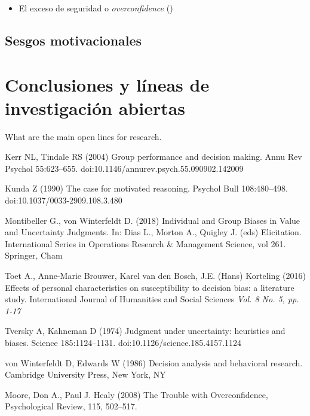\documentclass[a4paper,11pt]{article}
\begin{document}
\begin{itemize}
\item El exceso de seguridad o \textit{overconfidence} ()
\end{itemize}

\subsection{Sesgos motivacionales}


\section{Conclusiones y líneas de investigación abiertas}

What are the main open lines for research.




\begin{thebibliography}{}

Kerr NL, Tindale RS (2004) Group performance and decision making. Annu Rev Psychol 55:623–655. doi:10.1146/annurev.psych.55.090902.142009

Kunda Z (1990) The case for motivated reasoning. Psychol Bull 108:480–498. doi:10.1037/0033-2909.108.3.480

Montibeller G., von Winterfeldt D. (2018) Individual and Group Biases in Value and Uncertainty Judgments. In: Dias L., Morton A., Quigley J. (eds) Elicitation. International Series in Operations Research \& Management Science, vol 261. Springer, Cham

Toet A., Anne-Marie Brouwer, Karel van den Bosch, J.E. (Hans) Korteling (2016) Effects of personal characteristics on susceptibility to decision bias: a literature study. International Journal of Humanities and Social Sciences \textit{Vol. 8 No. 5, pp. 1-17}

Tversky A, Kahneman D (1974) Judgment under uncertainty: heuristics and biases. Science
185:1124–1131. doi:10.1126/science.185.4157.1124

von Winterfeldt D, Edwards W (1986) Decision analysis and behavioral research. Cambridge University Press, New York, NY

Moore, Don A., Paul J. Healy (2008) The Trouble with Overconfidence, Psychological Review, 115, 502–517.

\end{thebibliography}
\end{document}
